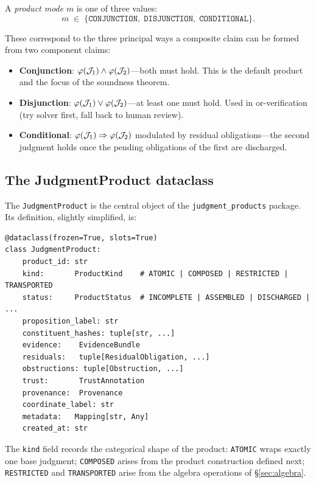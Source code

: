 \documentclass[11pt]{article}
\newcommand{\conj}{\mathbin{\wedge}}              %
\newcommand{\disj}{\mathbin{\vee}}                %
\begin{document}
\begin{definition}\label{def:mode}
A \emph{product mode} $m$ is one of three values:
\[
  m \;\in\; \{\texttt{CONJUNCTION},\; \texttt{DISJUNCTION},\;
              \texttt{CONDITIONAL}\}.
\]
\end{definition}

These correspond to the three principal ways a composite claim can be
formed from two component claims:
\begin{itemize}
  \item \textbf{Conjunction}: $\prop(\J_1) \conj \prop(\J_2)$---both must
        hold.  This is the default product and the focus of the soundness
        theorem.
  \item \textbf{Disjunction}: $\prop(\J_1) \disj \prop(\J_2)$---at least
        one must hold.  Used in or-verification (try solver first, fall
        back to human review).
  \item \textbf{Conditional}: $\varphi(\mathcal{J}_1) \Rightarrow \varphi(\mathcal{J}_2)$
        modulated by residual obligations---the second judgment holds once
        the pending obligations of the first are discharged.
\end{itemize}

\subsection{The JudgmentProduct dataclass}

The \texttt{JudgmentProduct} is the central object of the
\texttt{judgment\_products} package.  Its definition, slightly
simplified, is:

\begin{lstlisting}[style=jugeo-python, caption={JudgmentProduct dataclass
  (from \texttt{foundations/judgment\_products/models.py}).},
  label=lst:product]
@dataclass(frozen=True, slots=True)
class JudgmentProduct:
    product_id: str
    kind:       ProductKind    # ATOMIC | COMPOSED | RESTRICTED | TRANSPORTED
    status:     ProductStatus  # INCOMPLETE | ASSEMBLED | DISCHARGED | ...
    proposition_label: str
    constituent_hashes: tuple[str, ...]
    evidence:    EvidenceBundle
    residuals:   tuple[ResidualObligation, ...]
    obstructions: tuple[Obstruction, ...]
    trust:       TrustAnnotation
    provenance:  Provenance
    coordinate_label: str
    metadata:   Mapping[str, Any]
    created_at: str
\end{lstlisting}

The \texttt{kind} field records the categorical shape of the product:
\texttt{ATOMIC} wraps exactly one base judgment; \texttt{COMPOSED} arises
from the product construction defined next; \texttt{RESTRICTED} and
\texttt{TRANSPORTED} arise from the algebra operations of
\S\ref{sec:algebra}.
\end{document}
